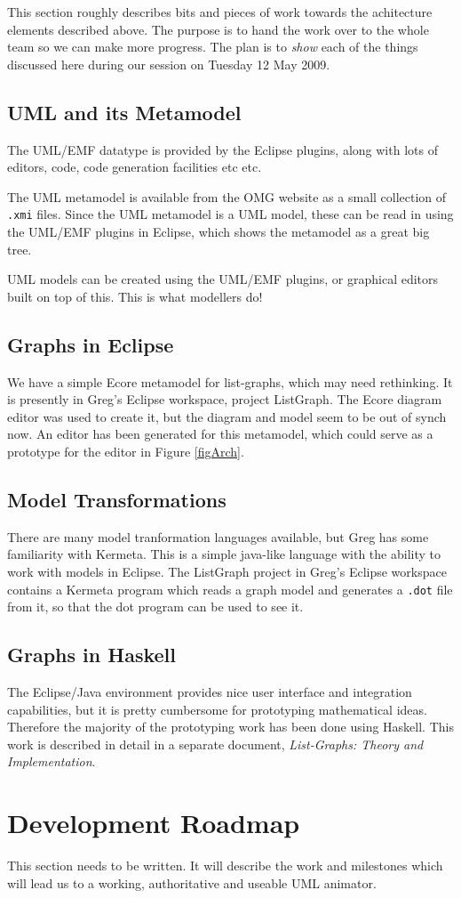 \documentclass[a4paper]{article}
\begin{document}
This section roughly describes bits and pieces of work towards the
achitecture elements described above.  The purpose is to hand the work
over to the whole team so we can make more progress.  The plan is to
\emph{show} each of the things discussed here during our session on
Tuesday 12 May 2009.

\subsection{UML and its Metamodel}
The UML/EMF datatype is provided by the Eclipse plugins, along with
lots of editors, code, code generation facilities etc etc.

The UML metamodel is available from the OMG website as a small
collection of {\tt .xmi} files.  Since the UML metamodel is a UML
model, these can be read in using the UML/EMF plugins in Eclipse,
which shows the metamodel as a great big tree.

UML models can be created using the UML/EMF plugins, or graphical
editors built on top of this.  This is what modellers do!  

\subsection{Graphs in Eclipse}
We have a simple Ecore metamodel for list-graphs, which may need
rethinking.  It is presently in Greg's Eclipse workspace, project
ListGraph.  The Ecore diagram editor was used to create it, but the
diagram and model seem to be out of synch now.  An editor has been
generated for this metamodel, which could serve as a prototype for the
{\sf editor} in Figure \ref{figArch}.

\subsection{Model Transformations}
There are many model tranformation languages available, but Greg has
some familiarity with Kermeta.  This is a simple java-like language
with the ability to work with models in Eclipse.  The ListGraph
project in Greg's Eclipse workspace contains a Kermeta program which
reads a graph model and generates a {\tt .dot} file from it, so that
the dot program can be used to see it.

\subsection{Graphs in Haskell}
The Eclipse/Java environment provides nice user interface and
integration capabilities, but it is pretty cumbersome for prototyping
mathematical ideas.  Therefore the majority of the prototyping work
has been done using Haskell.  This work is described in detail in a
separate document, \emph{List-Graphs: Theory and Implementation}.


\section{Development Roadmap}
\label{roadmap}
This section needs to be written.  It will describe the work and
milestones which will lead us to a working, authoritative and useable
UML animator.

 

\end{document}
